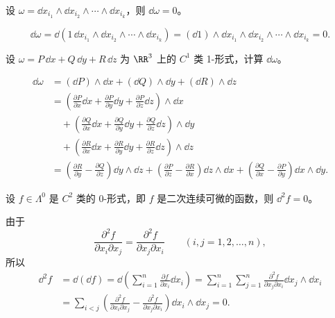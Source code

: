 \begin{xexample}[25.4.1]
设 $\omega=\dd x_{i_1}\wedge\dd x_{i_2}\wedge\cdots\wedge\dd x_{i_k}$，则 $\dd\omega=0$。
\end{xexample}
\begin{xproof}
\[
  \dd\omega=\dd(1\,\dd x_{i_1}\wedge\dd x_{i_2}\wedge\cdots\wedge\dd x_{i_k})
  =(\dd1)\wedge\dd x_{i_1}\wedge\dd x_{i_2}\wedge\cdots\wedge\dd x_{i_k}=0.
\]
\end{xproof}

\begin{xexample}[25.4.2]
设 $\omega=P\,\dd x+Q\,\dd y+R\,\dd z$ 为 $\RR^3$ 上的 $C^1$ 类 1-形式，计算 $\dd\omega$。
\end{xexample}
\begin{xsolution}
\begin{align*}
\dd\omega&=(\dd P)\wedge\dd x+(\dd Q)\wedge\dd y+(\dd R)\wedge\dd z\\
&=\left(\frac{\partial P}{\partial x}\dd x+\frac{\partial P}{\partial y}\dd y+\frac{\partial P}{\partial z}\dd z\right)\wedge\dd x\\
&\quad+\left(\frac{\partial Q}{\partial x}\dd x+\frac{\partial Q}{\partial y}\dd y+\frac{\partial Q}{\partial z}\dd z\right)\wedge\dd y\\
&\quad+\left(\frac{\partial R}{\partial x}\dd x+\frac{\partial R}{\partial y}\dd y+\frac{\partial R}{\partial z}\dd z\right)\wedge\dd z\\
&=\left(\frac{\partial R}{\partial y}-\frac{\partial Q}{\partial z}\right)\dd y\wedge\dd z
+\left(\frac{\partial P}{\partial z}-\frac{\partial R}{\partial x}\right)\dd z\wedge\dd x
+\left(\frac{\partial Q}{\partial x}-\frac{\partial P}{\partial y}\right)\dd x\wedge\dd y.
\end{align*}
\end{xsolution}

\begin{xexample}[25.4.3]
设 $f\in\Lambda^0$ 是 $C^2$ 类的 0-形式，即 $f$ 是二次连续可微的函数，则 $\dd^2f=0$。
\end{xexample}
\begin{xproof}
由于
\[
  \frac{\partial^2f}{\partial x_i\partial x_j}
  =\frac{\partial^2f}{\partial x_j\partial x_i}\qquad(i,j=1,2,\ldots,n),
\]
所以
\begin{align*}
\dd^2f&=\dd(\dd f)=\dd\left(\sum_{i=1}^n\frac{\partial f}{\partial x_i}\dd x_i\right)
=\sum_{i=1}^n\sum_{j=1}^n\frac{\partial^2f}{\partial x_j\partial x_i}\dd x_j\wedge\dd x_i\\
&=\sum_{i<j}\left(\frac{\partial^2f}{\partial x_i\partial x_j}-\frac{\partial^2f}{\partial x_j\partial x_i}\right)\dd x_i\wedge\dd x_j=0.
\end{align*}
\end{xproof}

